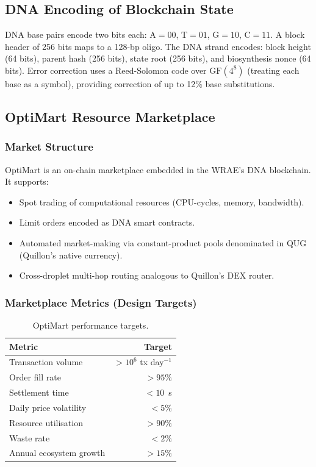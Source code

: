 \documentclass[12pt,a4paper]{article}
\begin{document}
\subsection{DNA Encoding of Blockchain State}

DNA base pairs encode two bits each:
$\mathrm{A} = 00$, $\mathrm{T} = 01$, $\mathrm{G} = 10$, $\mathrm{C} = 11$.
A block header of 256 bits maps to a 128-bp oligo.  The DNA strand encodes:
block height (64 bits), parent hash (256 bits), state root (256 bits), and
biosynthesis nonce (64 bits).  Error correction uses a Reed-Solomon code
over $\mathrm{GF}(4^8)$ (treating each base as a symbol), providing
correction of up to 12\% base substitutions.

\subsection{OptiMart Resource Marketplace}
\label{sec:optimart}

\subsubsection{Market Structure}

OptiMart is an on-chain marketplace embedded in the WRAE's DNA blockchain.
It supports:
\begin{itemize}
\item Spot trading of computational resources (CPU-cycles, memory, bandwidth).
\item Limit orders encoded as DNA smart contracts.
\item Automated market-making via constant-product pools denominated in
      \textsc{QUG} (Quillon's native currency).
\item Cross-droplet multi-hop routing analogous to Quillon's DEX router.
\end{itemize}

\subsubsection{Marketplace Metrics (Design Targets)}

\begin{table}[ht]
\centering
\caption{OptiMart performance targets.}
\label{tab:optimart}
\begin{tabular}{lr}
\toprule
\textbf{Metric} & \textbf{Target} \\
\midrule
Transaction volume    & $>10^6$ tx day$^{-1}$ \\
Order fill rate       & $>95\%$ \\
Settlement time       & $<10$~s \\
Daily price volatility & $<5\%$ \\
Resource utilisation  & $>90\%$ \\
Waste rate            & $<2\%$ \\
Annual ecosystem growth & $>15\%$ \\
\bottomrule
\end{tabular}
\end{table}
\end{document}

